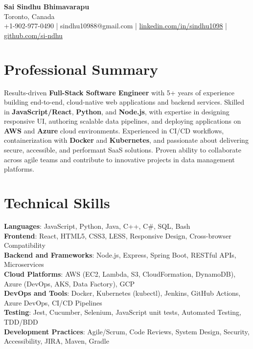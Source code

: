 \documentclass[letterpaper,11pt]{article}
\begin{document}
\begin{center}
  {\Large \textbf{Sai Sindhu Bhimavarapu}} \\
  Toronto, Canada \\
  +1-902-977-0490 \enspace | \enspace sindhu10988@gmail.com \enspace | \enspace \href{https://www.linkedin.com/in/sindhu1098/}{linkedin.com/in/sindhu1098} \enspace | \enspace \href{https://github.com/si-ndhu}{github.com/si-ndhu}
\end{center}

\section{Professional Summary}
  \begin{itemize}[leftmargin=0.15in, label={}]
    \small{\item{
     Results-driven \textbf{Full-Stack Software Engineer} with 5+ years of experience building end-to-end, cloud-native web applications and backend services. Skilled in \textbf{JavaScript/React}, \textbf{Python}, and \textbf{Node.js}, with expertise in designing responsive UI, authoring scalable data pipelines, and deploying applications on \textbf{AWS} and \textbf{Azure} cloud environments. Experienced in CI/CD workflows, containerization with \textbf{Docker} and \textbf{Kubernetes}, and passionate about delivering secure, accessible, and performant SaaS solutions. Proven ability to collaborate across agile teams and contribute to innovative projects in data management platforms.
    }}
  \end{itemize}
\vspace{-16pt}

\section{Technical Skills}
 \begin{itemize}[leftmargin=0.15in, label={}]
    \small{\item{
     \textbf{Languages}: JavaScript, Python, Java, C++, C\#, SQL, Bash \\
     \textbf{Frontend}: React, HTML5, CSS3, LESS, Responsive Design, Cross-browser Compatibility \\
     \textbf{Backend and Frameworks}: Node.js, Express, Spring Boot, RESTful APIs, Microservices \\
     \textbf{Cloud Platforms}: AWS (EC2, Lambda, S3, CloudFormation, DynamoDB), Azure (DevOps, AKS, Data Factory), GCP \\
     \textbf{DevOps and Tools}: Docker, Kubernetes (kubectl), Jenkins, GitHub Actions, Azure DevOps, CI/CD Pipelines \\
     \textbf{Testing}: Jest, Cucumber, Selenium, JavaScript unit tests, Automated Testing, TDD/BDD \\
     \textbf{Development Practices}: Agile/Scrum, Code Reviews, System Design, Security, Accessibility, JIRA, Maven, Gradle
    }}
 \end{itemize}
\vspace{-16pt}
\end{document}
